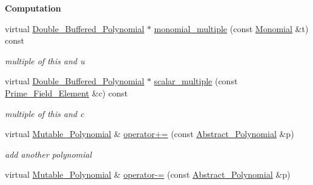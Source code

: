 \begin{Indent}\textbf{ Computation}\par
\begin{DoxyCompactItemize}
\item 
\mbox{\label{class_double___buffered___polynomial_ad642c3ef39e32094400f984d9094e78f}} 
virtual \hyperlink{class_double___buffered___polynomial}{Double\+\_\+\+Buffered\+\_\+\+Polynomial} $\ast$ \hyperlink{class_double___buffered___polynomial_ad642c3ef39e32094400f984d9094e78f}{monomial\+\_\+multiple} (const \hyperlink{class_monomial}{Monomial} \&t) const
\begin{DoxyCompactList}\small\item\em multiple of this and u \end{DoxyCompactList}\item 
\mbox{\label{class_double___buffered___polynomial_a30c02306311c8ed94a8eb07840bd5ea0}} 
virtual \hyperlink{class_double___buffered___polynomial}{Double\+\_\+\+Buffered\+\_\+\+Polynomial} $\ast$ \hyperlink{class_double___buffered___polynomial_a30c02306311c8ed94a8eb07840bd5ea0}{scalar\+\_\+multiple} (const \hyperlink{class_prime___field___element}{Prime\+\_\+\+Field\+\_\+\+Element} \&c) const
\begin{DoxyCompactList}\small\item\em multiple of this and c \end{DoxyCompactList}\item 
\mbox{\label{class_double___buffered___polynomial_a820f216eb97e0d3238b92996a0c80483}} 
virtual \hyperlink{class_mutable___polynomial}{Mutable\+\_\+\+Polynomial} \& \hyperlink{class_double___buffered___polynomial_a820f216eb97e0d3238b92996a0c80483}{operator+=} (const \hyperlink{class_abstract___polynomial}{Abstract\+\_\+\+Polynomial} \&p)
\begin{DoxyCompactList}\small\item\em add another polynomial \end{DoxyCompactList}\item 
\mbox{\label{class_double___buffered___polynomial_aef7a10e69a05bac6b02d8c752f0685c8}} 
virtual \hyperlink{class_mutable___polynomial}{Mutable\+\_\+\+Polynomial} \& \hyperlink{class_double___buffered___polynomial_aef7a10e69a05bac6b02d8c752f0685c8}{operator-\/=} (const \hyperlink{class_abstract___polynomial}{Abstract\+\_\+\+Polynomial} \&p)

\end{DoxyCompactItemize}
\end{Indent}
